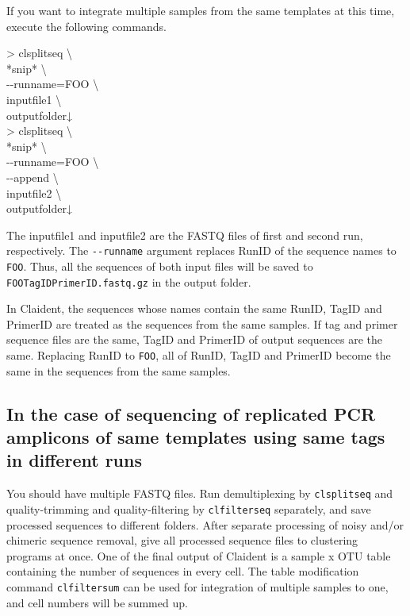 \documentclass[titlepage,10pt,a4paper,english]{jsbook}
\newenvironment{cmd}{\begin{oframed}\raggedright\ttfamily\footnotesize\setlength{\baselineskip}{1.4em}}{\end{oframed}\vspace{-1em}}
\begin{document}
If you want to integrate multiple samples from the same templates at this time, execute the following commands.

\begin{cmd}
{\textgreater} clsplitseq {\textbackslash}\\
*snip* {\textbackslash}\\
{-}{-}runname=FOO {\textbackslash}\\
inputfile1 {\textbackslash}\\
outputfolder↓\\
{\textgreater} clsplitseq {\textbackslash}\\
*snip* {\textbackslash}\\
{-}{-}runname=FOO {\textbackslash}\\
{-}{-}append {\textbackslash}\\
inputfile2 {\textbackslash}\\
outputfolder↓
\end{cmd}

The inputfile1 and inputfile2 are the FASTQ files of first and second run, respectively.
The \texttt{{-}{-}runname} argument replaces RunID of the sequence names to \texttt{FOO}.
Thus, all the sequences of both input files will be saved to \texttt{FOO{\textunderscore}{\textunderscore}TagID{\textunderscore}{\textunderscore}PrimerID.fastq.gz} in the output folder.

In Claident, the sequences whose names contain the same RunID, TagID and PrimerID are treated as the sequences from the same samples.
If tag and primer sequence files are the same, TagID and PrimerID of output sequences are the same.
Replacing RunID to \texttt{FOO}, all of RunID, TagID and PrimerID become the same in the sequences from the same samples.

\subsection{In the case of sequencing of replicated PCR amplicons of same templates using same tags in different runs}

You should have multiple FASTQ files.
Run demultiplexing by \texttt{clsplitseq} and quality-trimming and quality-filtering by \texttt{clfilterseq} separately, and save processed sequences to different folders.
After separate processing of noisy and/or chimeric sequence removal, give all processed sequence files to clustering programs at once.
One of the final output of Claident is a sample x OTU table containing the number of sequences in every cell.
The table modification command \texttt{clfiltersum} can be used for integration of multiple samples to one, and cell numbers will be summed up.
\end{document}
